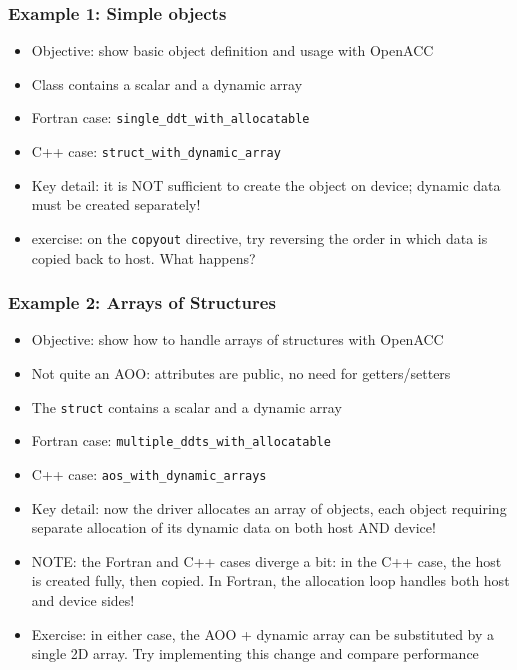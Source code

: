 \begin{frame}
    \frametitle{Example 1: Simple objects}
    \begin{itemize}
        \item Objective: show basic object definition and usage with OpenACC
        \item Class contains a scalar and a dynamic array
        \item Fortran case: \texttt{single\_ddt\_with\_allocatable}
        \item C++ case: \texttt{struct\_with\_dynamic\_array}
        \item Key detail: it is NOT sufficient to create the object on device; dynamic data must be created separately!
        \item exercise: on the \texttt{copyout} directive, try reversing the order in which data is copied back to host. What happens?
    \end{itemize}
\end{frame}

\begin{frame}
    \frametitle{Example 2: Arrays of Structures}
    \begin{itemize}
        \item Objective: show how to handle arrays of structures with OpenACC
        \item Not quite an AOO: attributes are public, no need for getters/setters
        \item The \texttt{struct} contains a scalar and a dynamic array
        \item Fortran case: \texttt{multiple\_ddts\_with\_allocatable}
        \item C++ case: \texttt{aos\_with\_dynamic\_arrays}
        \item Key detail: now the driver allocates an array of objects, each object requiring separate allocation of its dynamic data on both host AND device!
        \item NOTE: the Fortran and C++ cases diverge a bit: in the C++ case, the host is created fully, then copied. In Fortran, the allocation loop handles both host and device sides!
        \item Exercise: in either case, the AOO + dynamic array can be substituted by a single 2D array. Try implementing this change and compare performance
    \end{itemize}
\end{frame}